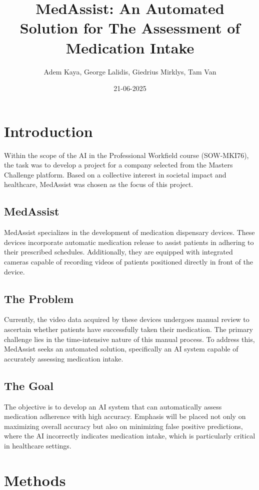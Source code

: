 \documentclass[a4paper,12pt]{article}
\title{MedAssist: An Automated Solution for The Assessment of Medication Intake}
\author{Adem Kaya, George Lalidis, Giedrius Mirklys, Tam Van}
\date{21-06-2025}
\begin{document}
\maketitle

\section{Introduction}
Within the scope of the AI in the Professional Workfield course (SOW-MKI76), the task was to develop a project for a company selected from the Masters Challenge platform. Based on a collective interest in societal impact and healthcare, MedAssist was chosen as the focus of this project.

\subsection{MedAssist}
MedAssist specializes in the development of medication dispensary devices. These devices incorporate automatic medication release to assist patients in adhering to their prescribed schedules. Additionally, they are equipped with integrated cameras capable of recording videos of patients positioned directly in front of the device.

\subsection{The Problem}
Currently, the video data acquired by these devices undergoes manual review to ascertain whether patients have successfully taken their medication. The primary challenge lies in the time-intensive nature of this manual process. To address this, MedAssist seeks an automated solution, specifically an AI system capable of accurately assessing medication intake.

\subsection{The Goal}
The objective is to develop an AI system that can automatically assess medication adherence with high accuracy. Emphasis will be placed not only on maximizing overall accuracy but also on minimizing false positive predictions, where the AI incorrectly indicates medication intake, which is particularly critical in healthcare settings.

\section{Methods}
\end{document}
